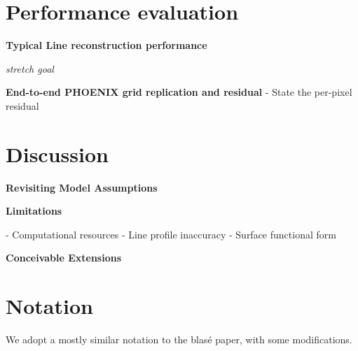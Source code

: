 \documentclass[twocolumn]{aastex631}
\begin{document}
\section{Performance evaluation}

\begin{mdframed}
    \textbf{Typical Line reconstruction performance}
    \textcolor{lightgray}{\blindtext}
\end{mdframed}

\begin{mdframed}
    \emph{stretch goal}\par
    \textbf{End-to-end PHOENIX grid replication and residual}
    - State the per-pixel residual
    \textcolor{lightgray}{\blindtext}
\end{mdframed}


\section{Discussion}
\begin{mdframed}
    \textbf{Revisiting Model Assumptions}

    \textcolor{lightgray}{\blindtext}
\end{mdframed}

\begin{mdframed}
    \textbf{Limitations}

    - Computational resources
    - Line profile inaccuracy
    - Surface functional form

    \textcolor{lightgray}{\blindtext}
\end{mdframed}


\begin{mdframed}
    \textbf{Conceivable Extensions}

    \textcolor{lightgray}{\blindtext}
\end{mdframed}


\pagebreak
\newpage

\begin{acknowledgments}
    \blindtext
\end{acknowledgments}


\software{}


\clearpage

\appendix
\section{Notation}
We adopt a mostly similar notation to the blas\'e paper, with some modifications.
\end{document}
